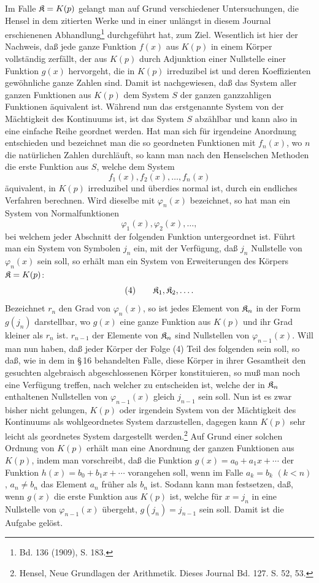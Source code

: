 Im Falle \(\mathfrak K=K(p)\) gelangt man auf Grund verschiedener Untersuchungen, die Hensel in dem zitierten Werke und in einer unlängst in diesem Journal erschienenen Abhandlung\footnote{Bd. 136 (1909), S. 183.} durchgeführt hat, zum Ziel. Wesentlich ist hier der Nachweis, daß jede ganze Funktion \(f(x)\) aus \(K(p)\) in einem Körper vollständig zerfällt, der aus \(K(p)\) durch Adjunktion einer Nullstelle einer Funktion \(g(x)\) hervorgeht, die in \(K(p)\) irreduzibel ist und deren Koeffizienten gewöhnliche ganze Zahlen sind. Damit ist nachgewiesen, daß das System aller ganzen Funktionen aus \(K(p)\) dem System \(S\) der ganzen ganzzahligen Funktionen äquivalent ist. Während nun das erstgenannte System von der Mächtigkeit des Kontinuums ist, ist das System \(S\) abzählbar und kann also in eine einfache Reihe geordnet werden. Hat man sich für irgendeine Anordnung entschieden und bezeichnet man die so geordneten Funktionen mit \(f_n(x)\), wo \(n\) die natürlichen Zahlen durchläuft, so kann man nach den Henselschen Methoden die erste Funktion aus \(S\), welche dem System
\[
f_1(x),f_2(x),\ldots,f_n(x)
\]
äquivalent, in \(K(p)\) irreduzibel und überdies normal ist, durch ein endliches Verfahren berechnen. Wird dieselbe mit \(\varphi_n(x)\) bezeichnet, so hat man ein System von Normalfunktionen
\[
\varphi_1(x),\varphi_2(x),\ldots,
\]
bei welchem jeder Abschnitt der folgenden Funktion untergeordnet ist. Führt man ein System von Symbolen \(j_n\) ein, mit der Verfügung, daß \(j_n\) Nullstelle von \(\varphi_n(x)\) sein soll, so erhält man ein System von Erweiterungen des Körpers \(\mathfrak K=K(p)\):
\[
(4)\qquad \mathfrak K_1,\mathfrak K_2,\ldots.
\]
Bezeichnet \(r_n\) den Grad von \(\varphi_n(x)\), so ist jedes Element von \(\mathfrak K_n\) in der Form \(g(j_n)\) darstellbar, wo \(g(x)\) eine ganze Funktion aus \(K(p)\) und ihr Grad kleiner als \(r_n\) ist. \(r_{n-1}\) der Elemente von \(\mathfrak K_n\) sind Nullstellen von \(\varphi_{n-1}(x)\). Will man nun haben, daß jeder Körper der Folge (4) Teil des folgenden sein soll, so daß, wie in dem in \S\,16 behandelten Falle, diese Körper in ihrer Gesamtheit den gesuchten algebraisch abgeschlossenen Körper konstituieren, so muß man noch eine Verfügung treffen, nach welcher zu entscheiden ist, welche der in \(\mathfrak K_n\) enthaltenen Nullstellen von \(\varphi_{n-1}(x)\) gleich \(j_{n-1}\) sein soll. Nun ist es zwar bisher nicht gelungen, \(K(p)\) oder irgendein System von der Mächtigkeit des Kontinuums als wohlgeordnetes System darzustellen, dagegen kann \(K(p)\) sehr leicht als geordnetes System dargestellt werden.\footnote{Hensel, Neue Grundlagen der Arithmetik. Dieses Journal Bd. 127. S. 52, 53.} Auf Grund einer solchen Ordnung von \(K(p)\) erhält man eine Anordnung der ganzen Funktionen aus \(K(p)\), indem man vorschreibt, daß die Funktion \(g(x)=a_0+a_1x+\cdots\) der Funktion \(h(x)=b_0+b_1x+\cdots\) vorangehen soll, wenn im Falle \(a_k=b_k\) \((k<n)\), \(a_n\neq b_n\) das Element \(a_n\) früher als \(b_n\) ist. Sodann kann man festsetzen, daß, wenn \(g(x)\) die erste Funktion aus \(K(p)\) ist, welche für \(x=j_n\) in eine Nullstelle von \(\varphi_{n-1}(x)\) übergeht, \(g(j_n)=j_{n-1}\) sein soll. Damit ist die Aufgabe gelöst.

